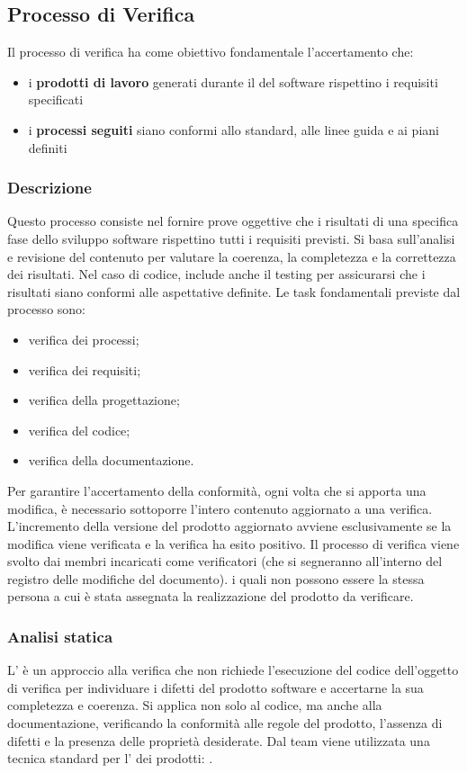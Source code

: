 \subsection{Processo di Verifica}
\label{subsec:proc_verifica}
Il processo di verifica ha come obiettivo fondamentale l'accertamento che:
\begin{itemize}
    \item i \textbf{prodotti di lavoro} generati durante il  del software rispettino i requisiti specificati
    \item i \textbf{processi seguiti} siano conformi allo standard, alle linee guida e ai piani definiti
\end{itemize}
\subsubsection{Descrizione}
Questo processo consiste nel fornire prove oggettive che i risultati di una specifica fase dello sviluppo software rispettino tutti i requisiti previsti. 
Si basa sull’analisi e revisione del contenuto per valutare la coerenza, la completezza e la correttezza dei risultati. Nel caso di codice, include anche il testing per assicurarsi che i risultati siano conformi alle aspettative definite.
Le task fondamentali previste dal processo sono:
\begin{itemize}
    \item verifica dei processi;
    \item verifica dei requisiti;
    \item verifica della progettazione;
    \item verifica del codice;
    \item verifica della documentazione.
\end{itemize}
Per garantire l'accertamento della conformità, ogni volta che si apporta una modifica, è necessario sottoporre l'intero contenuto aggiornato a una verifica. 
L'incremento della versione del prodotto aggiornato avviene esclusivamente se la modifica viene verificata e la verifica ha esito positivo.
Il processo di verifica viene svolto dai membri incaricati come verificatori (che si segneranno all'interno del registro delle modifiche del documento). 
i quali non possono essere la stessa persona a cui è stata assegnata la realizzazione del prodotto da verificare.
\subsubsection{Analisi statica}
L' è un approccio alla verifica che non richiede l'esecuzione del codice dell'oggetto di verifica per individuare i difetti del prodotto software 
e accertarne la sua completezza e coerenza.
Si applica non solo al codice, ma anche alla documentazione, verificando la conformità alle regole del prodotto, l'assenza di difetti e la presenza delle proprietà desiderate.
Dal team viene utilizzata una tecnica standard per l' dei prodotti: \textbf{}.
